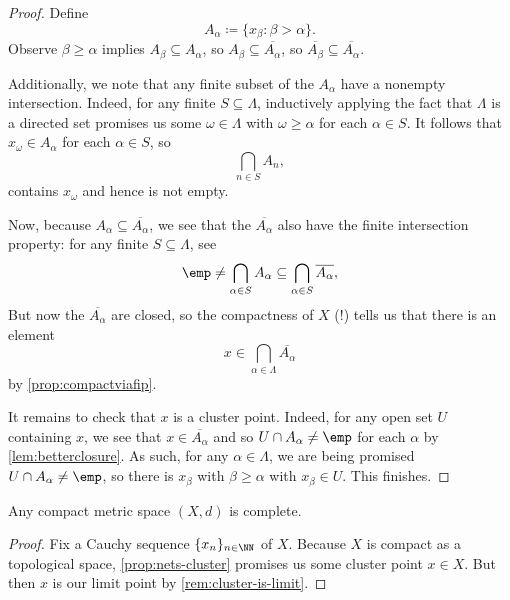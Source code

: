 \documentclass[../notes.tex]{subfiles}
\begin{document}
\begin{proof}
	Define
	\[A_\alpha\coloneqq\{x_\beta:\beta>\alpha\}.\]
	Observe $\beta\ge\alpha$ implies $A_\beta\subseteq A_\alpha$, so $A_\beta\subseteq\overline{A_\alpha}$, so $\overline{A_\beta}\subseteq\overline{A_\alpha}$.

	Additionally, we note that any finite subset of the $A_\alpha$ have a nonempty intersection. Indeed, for any finite $S\subseteq\Lambda$, inductively applying the fact that $\Lambda$ is a directed set promises us some $\omega\in\Lambda$ with $\omega\ge\alpha$ for each $\alpha\in S$. It follows that $x_\omega\in A_\alpha$ for each $\alpha\in S$, so
	\[\bigcap_{n\in S}A_n,\]
	contains $x_\omega$ and hence is not empty.

	Now, because $A_\alpha\subseteq\overline{A_\alpha}$, we see that the $\overline{A_\alpha}$ also have the finite intersection property: for any finite $S\subseteq\Lambda$, see
	\[\emp\ne\bigcap_{\alpha\in S}A_\alpha\subseteq\bigcap_{\alpha\in S}\overline{A_\alpha},\]
	But now the $\overline{A_\alpha}$ are closed, so the compactness of $X$ (!) tells us that there is an element
	\[x\in\bigcap_{\alpha\in\Lambda}\overline{A_\alpha}\]
	by \autoref{prop:compactviafip}.
	
	It remains to check that $x$ is a cluster point. Indeed, for any open set $U$ containing $x$, we see that $x\in\overline{A_\alpha}$ and so $U\cap A_\alpha\ne\emp$ for each $\alpha$ by \autoref{lem:betterclosure}. As such, for any $\alpha\in\Lambda$, we are being promised $U\cap A_\alpha\ne\emp$, so there is $x_\beta$ with $\beta\ge\alpha$ with $x_\beta\in U$. This finishes.
\end{proof}
\begin{corollary} \label{cor:compact-is-complete}
	Any compact metric space $(X,d)$ is complete.
\end{corollary}
\begin{proof}
	Fix a Cauchy sequence $\{x_n\}_{n\in\NN}$ of $X$. Because $X$ is compact as a topological space, \autoref{prop:nets-cluster} promises us some cluster point $x\in X$. But then $x$ is our limit point by \autoref{rem:cluster-is-limit}.
\end{proof}
\end{document}
